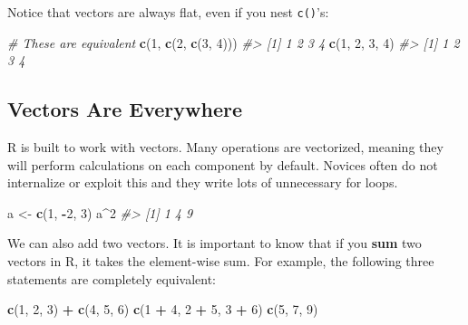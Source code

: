 \documentclass[]{book}
\newenvironment{Shaded}{\begin{snugshade}}{\end{snugshade}}
\newcommand{\KeywordTok}[1]{\textcolor[rgb]{0.13,0.29,0.53}{\textbf{#1}}}
\newcommand{\DecValTok}[1]{\textcolor[rgb]{0.00,0.00,0.81}{#1}}
\newcommand{\StringTok}[1]{\textcolor[rgb]{0.31,0.60,0.02}{#1}}
\newcommand{\CommentTok}[1]{\textcolor[rgb]{0.56,0.35,0.01}{\textit{#1}}}
\newcommand{\OperatorTok}[1]{\textcolor[rgb]{0.81,0.36,0.00}{\textbf{#1}}}
\newcommand{\NormalTok}[1]{#1}
\begin{document}
Notice that vectors are always flat, even if you nest \texttt{c()}'s:

\begin{Shaded}
\begin{Highlighting}[]
\CommentTok{# These are equivalent}
\KeywordTok{c}\NormalTok{(}\DecValTok{1}\NormalTok{, }\KeywordTok{c}\NormalTok{(}\DecValTok{2}\NormalTok{, }\KeywordTok{c}\NormalTok{(}\DecValTok{3}\NormalTok{, }\DecValTok{4}\NormalTok{)))}
\CommentTok{#> [1] 1 2 3 4}
\KeywordTok{c}\NormalTok{(}\DecValTok{1}\NormalTok{, }\DecValTok{2}\NormalTok{, }\DecValTok{3}\NormalTok{, }\DecValTok{4}\NormalTok{)}
\CommentTok{#> [1] 1 2 3 4}
\end{Highlighting}
\end{Shaded}

\subsection{Vectors Are Everywhere}\label{vectors-are-everywhere}

R is built to work with vectors. Many operations are vectorized, meaning
they will perform calculations on each component by default. Novices
often do not internalize or exploit this and they write lots of
unnecessary for loops.

\begin{Shaded}
\begin{Highlighting}[]
\NormalTok{a <-}\StringTok{ }\KeywordTok{c}\NormalTok{(}\DecValTok{1}\NormalTok{, }\OperatorTok{-}\DecValTok{2}\NormalTok{, }\DecValTok{3}\NormalTok{)}
\NormalTok{a}\OperatorTok{^}\DecValTok{2}
\CommentTok{#> [1] 1 4 9}
\end{Highlighting}
\end{Shaded}

We can also add two vectors. It is important to know that if you
\textbf{sum} two vectors in R, it takes the element-wise sum. For
example, the following three statements are completely equivalent:

\begin{Shaded}
\begin{Highlighting}[]
\KeywordTok{c}\NormalTok{(}\DecValTok{1}\NormalTok{, }\DecValTok{2}\NormalTok{, }\DecValTok{3}\NormalTok{) }\OperatorTok{+}\StringTok{ }\KeywordTok{c}\NormalTok{(}\DecValTok{4}\NormalTok{, }\DecValTok{5}\NormalTok{, }\DecValTok{6}\NormalTok{)}
\KeywordTok{c}\NormalTok{(}\DecValTok{1} \OperatorTok{+}\StringTok{ }\DecValTok{4}\NormalTok{, }\DecValTok{2} \OperatorTok{+}\StringTok{ }\DecValTok{5}\NormalTok{, }\DecValTok{3} \OperatorTok{+}\StringTok{ }\DecValTok{6}\NormalTok{)}
\KeywordTok{c}\NormalTok{(}\DecValTok{5}\NormalTok{, }\DecValTok{7}\NormalTok{, }\DecValTok{9}\NormalTok{)}
\end{Highlighting}
\end{Shaded}
\end{document}
